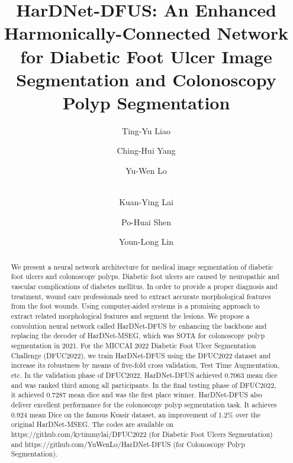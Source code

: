 \documentclass[runningheads]{llncs}
\title{HarDNet-DFUS: An Enhanced Harmonically-Connected Network for
Diabetic Foot Ulcer Image Segmentation and
Colonoscopy Polyp Segmentation}
\begin{document}
\author{Ting-Yu Liao  \and Ching-Hui Yang  \and Yu-Wen Lo  \and \\ Kuan-Ying Lai \and Po-Huai Shen \and Youn-Long Lin}
\authorrunning{ }
\titlerunning{ }


\maketitle              

\def\thefootnote{*}

\begin{abstract}
    We present a neural network architecture for
    medical image segmentation of diabetic foot ulcers and 
    colonoscopy polyps.
    Diabetic foot ulcers are caused by neuropathic and vascular complications of diabetes mellitus.
In order to provide a proper diagnosis and treatment,
    wound care professionals need to extract accurate morphological features
    from the foot wounds.
Using computer-aided systems is a promising approach
    to extract related morphological features and segment the lesions.
    We propose a convolution neural network called HarDNet-DFUS by
    enhancing the backbone and replacing the decoder of
    HarDNet-MSEG, which was SOTA for colonoscopy polyp segmentation in 2021.
    For the MICCAI 2022 Diabetic Foot Ulcer Segmentation Challenge (DFUC2022),
    we train HarDNet-DFUS using the DFUC2022 dataset and
    increase its robustness
    by means of five-fold cross validation, Test Time Augmentation, etc.
    In the validation phase of DFUC2022,
    HarDNet-DFUS achieved 0.7063 mean dice and
    was ranked third among all participants.
    In the final testing phase of DFUC2022,
    it achieved 0.7287 mean dice and
    was the first place winner.
    HarDNet-DFUS also deliver excellent performance for
    the colonoscopy polyp segmentation task.
    It achieves 0.924 mean Dice on the famous Kvasir dataset,
    an improvement of 1.2\% over the original HarDNet-MSEG.
    The codes are available on
    https://github.com/kytimmylai/DFUC2022
    (for Diabetic Foot Ulcers Segmentation) and https://github.com/YuWenLo/HarDNet-DFUS 
    (for Colonoscopy Polyp Segmentation).
    

\end{abstract}
\end{document}
